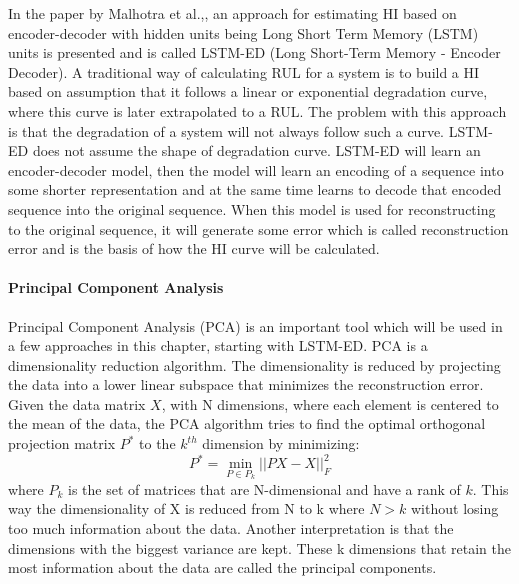 In the paper by Malhotra et al.,\cite{DBLP:journals/corr/MalhotraTRAVAS16}, an approach for estimating HI based on encoder-decoder
with hidden units being Long Short Term Memory (LSTM) units is presented and is called LSTM-ED (Long Short-Term Memory - Encoder Decoder).
A traditional way of calculating RUL for a system is to build a HI based on assumption that it follows a linear or exponential degradation
curve, where this curve is later extrapolated to a RUL. The problem with this approach is that the degradation of a system will not always follow
such a curve. LSTM-ED does not assume the shape of degradation curve. LSTM-ED will learn an
encoder-decoder model, then the model will learn an encoding of a sequence into some shorter representation and at the same time learns
to decode that encoded sequence into the original sequence. When this model is used for reconstructing to the original sequence, it will generate
some error which is called reconstruction error and is the basis of how the HI curve will be calculated.


\paragraph{Principal Component Analysis}
Principal Component Analysis (PCA) is an important tool which will be
used in a few approaches in this chapter, starting with LSTM-ED.
PCA is a dimensionality reduction algorithm. The dimensionality is reduced by projecting the data into a lower linear subspace
that minimizes the reconstruction error. Given the data matrix $X$, with N dimensions, where each element is centered to the mean of
the data, the PCA algorithm tries to find the optimal orthogonal projection matrix $P^{*}$ to the $k^{th}$ dimension by minimizing:
\begin{equation}
    P^{*} = \min_{P \in P_k} ||PX-X||_F^2
\end{equation}
where $P_k$ is the set of matrices that are N-dimensional and have a rank of $k$.
This way the dimensionality of X is reduced from N to k where $N>k$ without losing too much information
about the data. Another interpretation is that the dimensions with the biggest variance are kept. These k
dimensions that retain the most information about the data are called the principal components. \cite{MohriFML}

